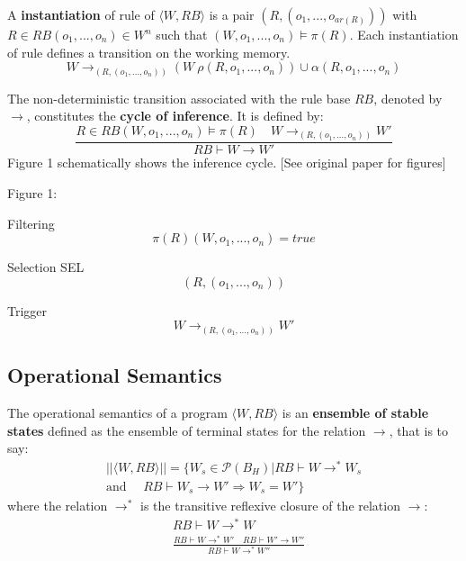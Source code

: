 A \textbf{instantiation} of rule of $\langle W, RB \rangle$ is a pair $(R, (o_1, ..., o_{ar(R)}))$ with
$R \in RB(o_1, ..., o_n) \in W^n$ such that $(W, o_1, ..., o_n) \vDash \pi(R)$.  Each instantiation of rule
defines a transition on the working memory.
\begin{equation}
W \rightarrow_{(R, (o_1, ... , o_n))} (W \ \rho(R, o_1, ..., o_n)) \cup \alpha(R, o_1, ..., o_n)
\nonumber
\end{equation}

The non-deterministic transition associated with the rule base $RB$, denoted by $\rightarrow$,
constitutes the \textbf{cycle of inference}. It is defined by:
\begin{equation}
\frac{R \in RB (W, o_1, ..., o_n) \vDash \pi(R) \quad W \rightarrow_{(R, (o_1, ..., o_n))} W'}
{RB \vdash W \rightarrow W'}
\end{equation}
Figure 1 schematically shows the inference cycle. [See original paper for figures]

Figure 1:

Filtering
\begin{equation}
\pi(R)(W, o_1, ..., o_n) = true
\nonumber
\end{equation}

Selection SEL
\begin{equation}
(R, (o_1, ..., o_n))
\nonumber
\end{equation}

Trigger
\begin{equation}
W \rightarrow_{(R, (o_1, ..., o_n))} W'
\nonumber
\end{equation}

\subsection{Operational Semantics}

The operational semantics of a program $\langle W, RB \rangle$ is an \textbf{ensemble of stable states}
defined as the ensemble of terminal states for the relation $\rightarrow$, that is to say:
\begin{eqnarray}
|| \langle W, RB \rangle || = \{ W_s \in \mathcal{P} (B_H) | RB \vdash W \rightarrow^* W_s \nonumber \\
\mbox{and } \quad RB \vdash W_s \rightarrow W' \Rightarrow W_s = W' \} \nonumber
\end{eqnarray}
where the relation $\rightarrow^*$ is the transitive reflexive closure of the relation $\rightarrow$:
\begin{eqnarray}
& RB \vdash W \rightarrow^* W \nonumber \\
& \displaystyle \frac{RB \vdash W \rightarrow^* W' \quad RB \vdash W' \rightarrow W''}
{RB \vdash W \rightarrow^* W''} \nonumber
\end{eqnarray}

